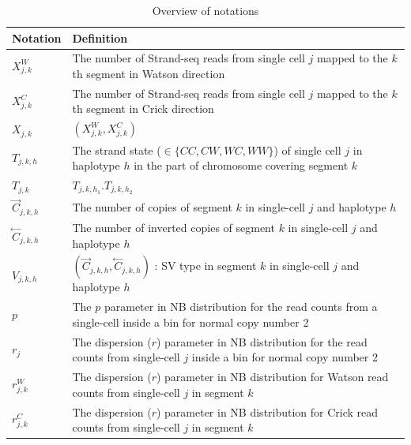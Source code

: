 \documentclass[12pt]{article}
\renewcommand{\j}{j} %
\newcommand{\CN}{C} %
\newcommand{\X}{X} %
\renewcommand{\k}{k} %
\newcommand{\h}{h} %
\newcommand{\T}{T} %
\newcommand{\V}{V} %
\begin{document}
\begin{table}[tb]
	\caption{Overview of notations}
	\centering
	\begin{tabular}{  p{4cm} p{12.5cm} }
		\hline
		Notation & Definition\\
		\hline
		$\X_{\j,\k}^W$ & The number of Strand-seq reads from single cell $\j$ mapped to the $\k$th segment in Watson direction\\

		$\X_{\j,\k}^C$ & The number of Strand-seq reads from single cell $\j$ mapped to the $\k$th segment in Crick direction\\
		
		$\X_{\j,\k}$ & $(\X_{\j,\k}^W, \X_{\j,\k}^C)$\\
		
		$\T_{\j, \k, \h}$ & The strand state ($\in \{CC,CW,WC,WW\}$) of single cell $\j$ in haplotype $\h$ in the part of chromosome covering segment $\k$\\
		
		$\T_{\j,\k}$ & $\T_{\j, \k, \h_1}.\T_{\j, \k, \h_2}$\\
		
		$\stackrel{\rightarrow}{\CN}_{\j,\k,\h}$ & The number of copies of segment $\k$ in single-cell $\j$ and haplotype $\h$ \\
		
		$\stackrel{\leftarrow}{\CN}_{\j,\k,\h}$ & The number of inverted copies of segment $\k$ in single-cell $\j$ and haplotype $\h$ \\
		
		$\V_{\j, \k, \h}$ &$(\stackrel{\rightarrow}{\CN}_{\j,\k,\h}, \stackrel{\leftarrow}{\CN}_{\j,\k,\h})$ : SV type in segment $\k$ in single-cell $\j$ and haplotype $\h$\\
		
		$p$ & The $p$ parameter in NB distribution for the read counts from a single-cell inside a bin for normal copy number 2\\
		
		$r_\j$ & The dispersion ($r$) parameter in NB distribution for the read counts from single-cell $\j$ inside a bin for normal copy number 2\\
		
		$r_{\j,\k}^W$ & The dispersion ($r$) parameter in NB distribution for Watson read counts from single-cell $\j$ in segment $\k$\\
		
		$r_{\j,\k}^C$ & The dispersion ($r$) parameter in NB distribution for Crick read counts from single-cell $\j$ in segment $\k$\\
		

\end{tabular}
\end{table}
\end{document}
